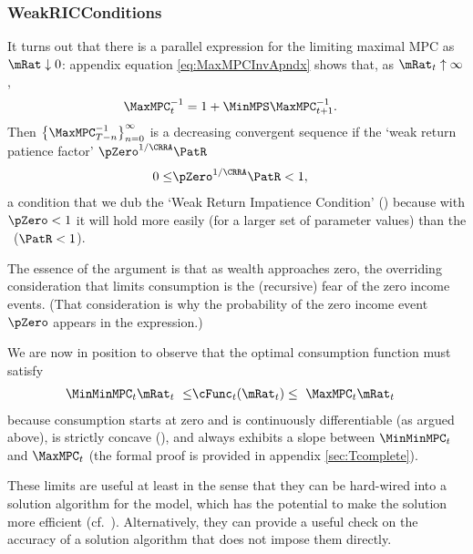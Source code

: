 \documentclass[BufferStockTheory]{subfiles}
\begin{document}
\subsubsection{WeakRICConditions}{}
\hypertarget{MPCnvrsUpper}{}
\hypertarget{WRIC}{}
It turns out that there is a parallel expression for the limiting maximal 
MPC as $\mRat \downarrow 0$: appendix equation \eqref{eq:MaxMPCInvApndx}  shows that, as $\mRat_{t} \uparrow \infty$,
\begin{align}
  \MaxMPC_{t}^{-1}  & = 1+\MinMPS \MaxMPC_{t+1}^{-1} \label{eq:MaxMPCInv}.
\end{align}
\hypertarget{WRIF}{}  
Then
$\left\{\MaxMPC_{T-n}^{-1}\right\} _{n=0}^{\infty}$ is a decreasing %
convergent sequence if the `weak return patience factor' $\pZero^{1/\CRRA}\PatR$ 
\begin{align}
  0 \leq & \pZero^{1/\CRRA} \PatR < 1 \label{eq:WRIC},
\end{align}
a condition that we dub the `Weak Return Impatience Condition' (\WRIC)
because with $\pZero < 1$ it will hold more easily (for a larger set of parameter
values) than the \RIC~($\PatR < 1$).

The essence of the argument is that as wealth approaches zero, the overriding
consideration that limits consumption is the (recursive) fear of the zero
income events.  (That consideration is why the probability of the zero
income event $\pZero$ appears in the expression.)  

We are now in position to observe that the optimal consumption function must satisfy
\begin{align}
  \MinMinMPC_{t} \mRat_{t} ~ \leq &   \cFunc_{t}(\mRat_{t})  \leq  ~ \MaxMPC_{t} \mRat_{t} \label{eq:cBounds}
\end{align}
because consumption starts at zero and is continuously
differentiable (as argued above), is strictly
concave (\cite{ckConcavity}), and always exhibits a
slope between $\MinMinMPC_{t}$ and $\MaxMPC_{t}$ (the formal proof is provided in appendix \ref{sec:Tcomplete}).

These limits are useful at least in the sense that they can be hard-wired into a solution algorithm for the model, which has the potential to make the solution more efficient (cf.\ \cite{cctwMoM}).  Alternatively, they can provide a useful check on the accuracy of a solution algorithm that does not impose them directly.

\begin{comment}
  If the \FHWC~does not hold, we make do with a less useful bound on the minimal MPC: It is
  weakly greater than zero, which follows from the logic in
  \ref{sec:cExists}; hence the `max' in \eqref{eq:MinMinMPCDef}.
\end{comment}
\end{document}
